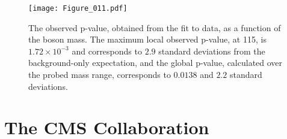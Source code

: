 \documentclass[11pt,twoside,a4paper,cmspaper,final,collab]{cms-tdr}
\begin{document}
\begin{figure}[hbtp]
\begin{center}
\texttt{[image: Figure\_011.pdf]}
\caption{
The observed $\text{p}$-value, obtained from the fit to data, as a function of the \PZpr boson mass. 
The maximum local observed $\text{p}$-value, at 115\GeV, is $1.72\times 10^{-3}$ and 
corresponds to $2.9$ standard deviations from the background-only expectation, 
and the global $\text{p}$-value, calculated over the probed mass range, corresponds to $0.0138$ and $2.2$ standard deviations.
\label{fig:aux_pvalue}
}
\end{center}
\end{figure}

\cleardoublepage \section{The CMS Collaboration \label{app:collab}}\begin{sloppypar}\end{sloppypar}
\end{document}
